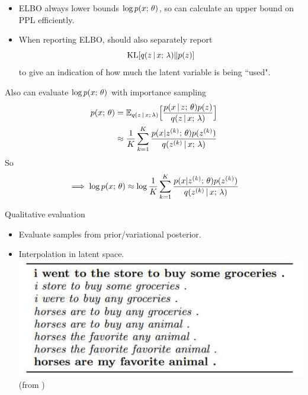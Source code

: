 \begin{frame}
\begin{itemize}
    \item ELBO always lower bounds $\log p(x ; \, \theta)$, so can calculate an upper bound on PPL efficiently.
    \item When reporting ELBO, should also separately report
    \[ \operatorname*{KL}[q(z \,|\, x ; \, \lambda) \Vert p(z)] \] 
    to give an indication of how much the latent variable is being ``used".
\end{itemize}
\end{frame} 

\begin{frame}
    
    Also can evaluate $\log p(x ; \, \theta)$ with importance sampling
    \begin{align*}
        p(x ; \, \theta) &= \mathbb{E}_{q(z \,|\, x ; \, \lambda)}\Big[\frac{p(x \,|\, z ; \, \theta)p(z)}{q(z \,|\, x ; \, \lambda)}\Big] \\
        &\approx \frac{1}{K}\sum_{k=1}^K \frac{p(x | z^{(k)} ; \, \theta)p(z^{(k)})}{q(z^{(k)} \,|\, x ; \, \lambda)}
    \end{align*}
    So 
    \[ 
    \implies \log p(x ; \, \theta) \approx \log \frac{1}{K}\sum_{k=1}^K \frac{p(x | z^{(k)} ; \, \theta)p(z^{(k)})}{q(z^{(k)} \,|\, x ; \, \lambda)}
\]
\end{frame} 

\begin{frame}
Qualitative evaluation 
\begin{itemize}
    \item Evaluate samples from prior/variational posterior. 
    \item Interpolation in latent space. 
\center
\includegraphics[scale=0.5]{pics/zinterp.jpg} \\
(from \cite{Bowman2016})
\end{itemize}
\end{frame} 

